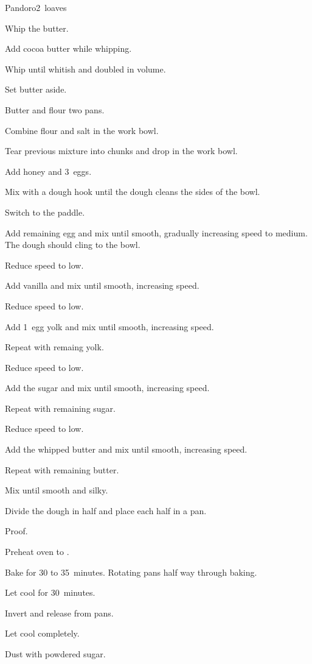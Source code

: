 \begin{recipe}{Pandoro}{}{2~loaves}
\begin{directions}
\item Whip the butter.
\item Add cocoa butter while whipping.
\item Whip until whitish and doubled in volume.
\item Set butter aside.
\item Butter and flour two  pans.
\item Combine flour and salt in the work bowl.
\item Tear previous mixture into chunks and drop in the work bowl.
\item Add honey and 3~eggs.
\item Mix with a dough hook until the dough cleans the sides of the bowl.
\item Switch to the paddle.
\item Add remaining egg and mix until smooth, gradually increasing speed to medium. The dough should cling to the bowl.
\item Reduce speed to low.
\item Add vanilla and mix until smooth, increasing speed.
\item Reduce speed to low.
\item Add 1~egg yolk and mix until smooth, increasing speed.
\item Repeat with remaing yolk.
\item Reduce speed to low.
\item Add \half{} the sugar and mix until smooth, increasing speed.
\item Repeat with remaining sugar.
\item Reduce speed to low.
\item Add \half{} the whipped butter and mix until smooth, increasing speed.
\item Repeat with remaining butter.
\item Mix until smooth and silky.
\item Divide the dough in half and place each half in a pan.
\item Proof.
\end{directions}

\begin{directions}
\item Preheat oven to .
\item Bake for 30 to 35~minutes. Rotating pans half way through baking.
\item Let cool for 30~minutes.
\item Invert and release from pans.
\item Let cool completely.
\item Dust with powdered sugar.
\end{directions}

\end{recipe}
